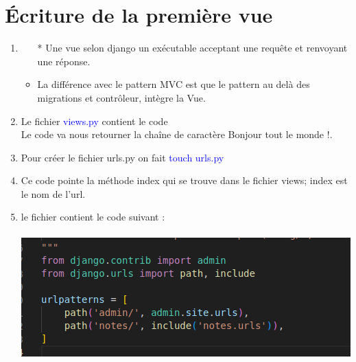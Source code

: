 \documentclass[10pt,a4paper]{article}
\begin{document}
\section{Écriture de la première vue}
\begin{enumerate}
\item
\begin{itemize}
\item[]
\item[*] Une vue selon django un exécutable acceptant une requête et renvoyant une réponse.
\item La différence avec le pattern MVC est que le pattern au delà des migrations et contrôleur, intègre la Vue.
\end{itemize}
\item Le fichier \textcolor{blue}{views.py} contient le code \\
Le code va nous retourner la chaîne de caractère Bonjour tout le monde !.
\item Pour créer le fichier urls.py on fait \textcolor{blue}{touch urls.py}
\item Ce code pointe la méthode index qui se trouve dans le fichier views; index est le nom de l'url.
\item le fichier contient le code suivant :\\\\
\includegraphics[scale=0.8]{9.png}



\end{enumerate}
\end{document}
